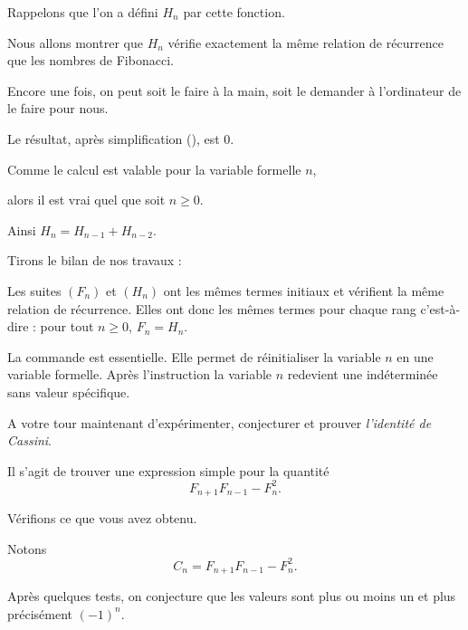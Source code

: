 \change

Rappelons que l'on a défini $H_n$ par cette fonction.

\change
Nous allons montrer que $H_n$ vérifie exactement 
la même relation de récurrence que les nombres de Fibonacci.

Encore une fois, on peut soit le faire à la main, 
soit le demander à l'ordinateur de le faire pour nous.

\change
 
Le résultat, après simplification (), est $0$. 

\change

Comme le calcul est valable pour la variable formelle $n$, 

\change

alors il est vrai quel que soit $n\ge0$. 

Ainsi $H_n=H_{n-1}+H_{n-2}$.   


\change

Tirons le bilan de nos travaux :

Les suites $(F_n)$ et $(H_n)$ ont les mêmes termes initiaux et 
vérifient la même relation de récurrence. 
Elles ont donc les mêmes termes pour chaque rang c'est-à-dire : 
      pour tout $n\ge0$, $F_n=H_n$.

      
  La commande  est essentielle. Elle permet de réinitialiser 
  la variable $n$ en une variable formelle. 
  Après l'instruction  la variable $n$ redevient 
  une indéterminée  sans valeur spécifique.

\diapo

A votre tour maintenant d'expérimenter, conjecturer et prouver 
\emph{l'identité de Cassini}.

Il s'agit de trouver une expression simple pour la quantité
$$F_{n+1}F_{n-1}-F_n^2.$$



\diapo

Vérifions ce que vous avez obtenu.


Notons $$C_n = F_{n+1}F_{n-1}-F_n^2.$$

\change

Après quelques tests, on conjecture que les valeurs sont plus ou moins un et plus précisément $(-1)^n$.
 

